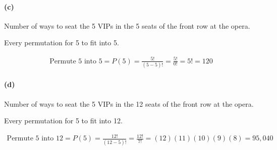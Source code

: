     \paragraph*{(c)}
    Number of ways to seat the 5 VIPs in the 5 seats of the front row at the opera.

    \begin{mdframed}
        Every permutation for 5 to fit into 5.

        \begin{equation*}
            \begin{gathered}
                \text{Permute 5 into 5} = P(5) = \frac{5!}{(5-5)!} = \frac{5!}{0!} = 5! = \boxed{120}
            \end{gathered}
        \end{equation*}
    \end{mdframed}

    \paragraph*{(d)}
    Number of ways to seat the 5 VIPs in the 12 seats of the front row at the opera.

    \begin{mdframed}
        Every permutation for 5 to fit into 12.

        \begin{equation*}
            \begin{gathered}
                \text{Permute 5 into 12} = P(5) = \frac{12!}{(12-5)!} = \frac{12!}{7!} = (12)(11)(10)(9)(8) = \boxed{95,040}
            \end{gathered}
        \end{equation*}
    \end{mdframed}


